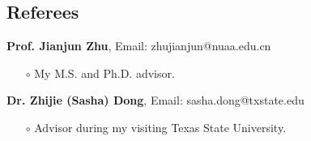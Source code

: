 \documentclass[margin]{res}
\begin{document}
\begin{resume}
\section{\sc Referees}

\textbf{Prof. Jianjun Zhu}, Email: zhujianjun@nuaa.edu.cn
\begin{itemize} \itemsep -2pt
\item[\(\circ\)] My M.S. and Ph.D. advisor.
\end{itemize} \vspace{-1em}
\textbf{Dr. Zhijie (Sasha) Dong}, Email: sasha.dong@txstate.edu
\begin{itemize} \itemsep -2pt
\item[\(\circ\)] Advisor during my visiting Texas State University.
\end{itemize}

\end{resume} 
\end{document}
